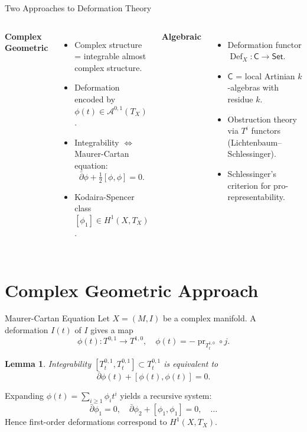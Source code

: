 \documentclass{beamer}
\theoremstyle{definition}
\theoremstyle{plain}
\newtheorem{lem}[defn]{Lemma}
\begin{document}
\begin{frame}{Two Approaches to Deformation Theory}
    \begin{columns}[T]
        \textbf{Complex Geometric}
        \begin{itemize}
            \item Complex structure = integrable almost complex structure.
            \item Deformation encoded by $\phi(t) \in \mathcal{A}^{0,1}(T_X)$.
            \item Integrability $\iff$ Maurer-Cartan equation:
            \[
            \bar\partial \phi + \tfrac12[\phi,\phi]=0.
            \]
            \item Kodaira-Spencer class $[\phi_1] \in H^1(X,T_X)$.
        \end{itemize}
        \textbf{Algebraic}
        \begin{itemize}
            \item Deformation functor $\operatorname{Def}_X: \mathsf{C} \to \mathsf{Set}$.
            \item $\mathsf{C}$ = local Artinian $k$-algebras with residue $k$.
            \item Obstruction theory via $T^i$ functors (Lichtenbaum–Schlessinger).
            \item Schlessinger's criterion for pro-representability.
        \end{itemize}
    \end{columns}
\end{frame}

\section{Complex Geometric Approach}

\begin{frame}{Maurer-Cartan Equation}
    Let $X = (M,I)$ be a complex manifold. A deformation $I(t)$ of $I$ gives a map
    \[
    \phi(t): T^{0,1} \to T^{1,0}, \quad \phi(t) = -\operatorname{pr}_{T_t^{1,0}}\circ j.
    \]
    \begin{lem}
        Integrability $[T_t^{0,1},T_t^{0,1}]\subset T_t^{0,1}$ is equivalent to
        \[
        \bar\partial \phi(t) + [\phi(t),\phi(t)] = 0.
        \]
    \end{lem}
    \pause
    Expanding $\phi(t)=\sum_{i\ge1}\phi_i t^i$ yields a recursive system:
    \[
    \bar\partial\phi_1=0,\quad \bar\partial\phi_2+[\phi_1,\phi_1]=0,\quad \dots
    \]
    Hence first-order deformations correspond to $H^1(X,T_X)$.
\end{frame}
\end{document}
